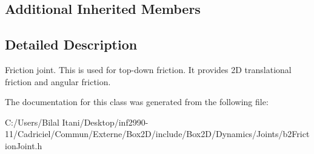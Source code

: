 \subsection*{Additional Inherited Members}


\subsection{Detailed Description}
Friction joint. This is used for top-\/down friction. It provides 2D translational friction and angular friction. 

The documentation for this class was generated from the following file\+:\begin{DoxyCompactItemize}
\item 
C\+:/\+Users/\+Bilal Itani/\+Desktop/inf2990-\/11/\+Cadriciel/\+Commun/\+Externe/\+Box2\+D/include/\+Box2\+D/\+Dynamics/\+Joints/b2\+Friction\+Joint.\+h\end{DoxyCompactItemize}
